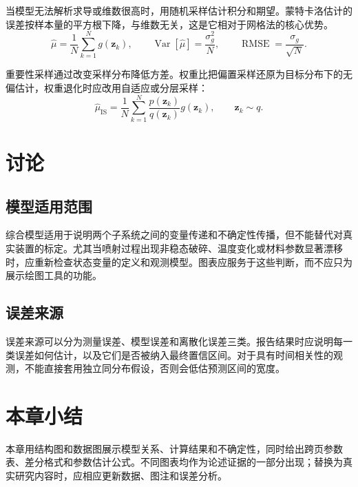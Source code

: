 当模型无法解析求导或维数很高时，用随机采样估计积分和期望。蒙特卡洛估计的误差按样本量的平方根下降，与维数无关，这是它相对于网格法的核心优势。
\begin{equation}
  \hat{\mu}=\frac{1}{N}\sum_{k=1}^{N}g(\bm{z}_k),\qquad
  \operatorname{Var}[\hat{\mu}]=\frac{\sigma_g^2}{N},\qquad
  \operatorname{RMSE}=\frac{\sigma_g}{\sqrt{N}}.
  \label{eq:monte-carlo}
\end{equation}

重要性采样通过改变采样分布降低方差。权重比把偏置采样还原为目标分布下的无偏估计，权重退化时应改用自适应或分层采样：
\begin{equation}
  \hat{\mu}_{\mathrm{IS}}
  =\frac{1}{N}\sum_{k=1}^{N}
  \frac{p(\bm{z}_k)}{q(\bm{z}_k)}g(\bm{z}_k),\qquad
  \bm{z}_k\sim q.
  \label{eq:importance-sampling}
\end{equation}

\section{讨论}

\subsection{模型适用范围}

综合模型适用于说明两个子系统之间的变量传递和不确定性传播，但不能替代对真实装置的标定。尤其当喷射过程出现非稳态破碎、温度变化或材料参数显著漂移时，应重新检查状态变量的定义和观测模型。图表应服务于这些判断，而不应只为展示绘图工具的功能。

\subsection{误差来源}

误差来源可以分为测量误差、模型误差和离散化误差三类。报告结果时应说明每一类误差如何估计，以及它们是否被纳入最终置信区间。对于具有时间相关性的观测，不能直接套用独立同分布假设，否则会低估预测区间的宽度。

\section{本章小结}

本章用结构图和数据图展示模型关系、计算结果和不确定性，同时给出跨页参数表、差分格式和参数估计公式。不同图表均作为论述证据的一部分出现；替换为真实研究内容时，应相应更新数据、图注和误差分析。
